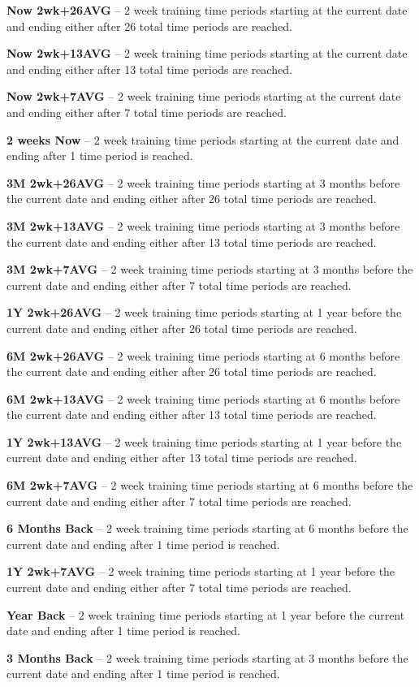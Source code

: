 \begin{description}
\item {\bf Now 2wk+26AVG} -- 2 week training time periods starting at
  the current date and ending either after 26 total time periods are
  reached.
\item {\bf Now 2wk+13AVG} -- 2 week training time periods starting at
  the current date and ending either after 13 total time periods are
  reached.
\item {\bf Now 2wk+7AVG} -- 2 week training time periods starting at
  the current date and ending either after 7 total time periods are
  reached.
\item {\bf 2 weeks Now} -- 2 week training time periods starting at
  the current date and ending after 1 time period is reached.
\item {\bf 3M 2wk+26AVG} -- 2 week training time periods starting at 3
  months before the current date and ending either after 26 total time
  periods are reached.
\item {\bf 3M 2wk+13AVG} -- 2 week training time periods starting at 3
  months before the current date and ending either after 13 total time
  periods are reached.
\item {\bf 3M 2wk+7AVG} -- 2 week training time periods starting at 3
  months before the current date and ending either after 7 total time
  periods are reached.
\item {\bf 1Y 2wk+26AVG} -- 2 week training time periods starting at 1
  year before the current date and ending either after 26 total time
  periods are reached.
\item {\bf 6M 2wk+26AVG} -- 2 week training time periods starting at 6
  months before the current date and ending either after 26 total time
  periods are reached.
\item {\bf 6M 2wk+13AVG} -- 2 week training time periods starting at 6
  months before the current date and ending either after 13 total time
  periods are reached.
\item {\bf 1Y 2wk+13AVG} -- 2 week training time periods starting at 1
  year before the current date and ending either after 13 total time
  periods are reached.
\item {\bf 6M 2wk+7AVG} -- 2 week training time periods starting at 6
  months before the current date and ending either after 7 total time
  periods are reached.
\item {\bf 6 Months Back} -- 2 week training time periods starting at
  6 months before the current date and ending after 1 time period is
  reached.
\item {\bf 1Y 2wk+7AVG} -- 2 week training time periods starting at 1
  year before the current date and ending either after 7 total time
  periods are reached.
\item {\bf Year Back} -- 2 week training time periods starting at 1
  year before the current date and ending after 1 time period is
  reached.
\item {\bf 3 Months Back} -- 2 week training time periods starting at
  3 months before the current date and ending after 1 time period is
  reached.
\end{description}



